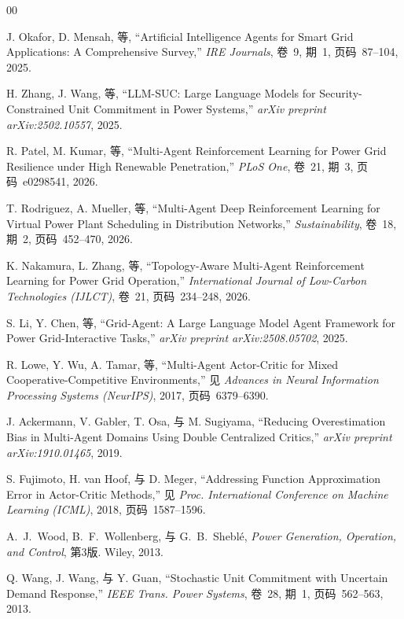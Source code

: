 \documentclass[conference]{IEEEtran}
\begin{document}
\begin{thebibliography}{00}

J. Okafor, D. Mensah, 等, ``Artificial Intelligence Agents for Smart Grid Applications: A Comprehensive Survey,''
\emph{IRE Journals}, 卷~9, 期~1, 页码~87--104, 2025.

H. Zhang, J. Wang, 等, ``LLM-SUC: Large Language Models for Security-Constrained Unit Commitment in Power Systems,''
\emph{arXiv preprint arXiv:2502.10557}, 2025.

R. Patel, M. Kumar, 等, ``Multi-Agent Reinforcement Learning for Power Grid Resilience under High Renewable Penetration,''
\emph{PLoS One}, 卷~21, 期~3, 页码~e0298541, 2026.

T. Rodriguez, A. Mueller, 等, ``Multi-Agent Deep Reinforcement Learning for Virtual Power Plant Scheduling in Distribution Networks,''
\emph{Sustainability}, 卷~18, 期~2, 页码~452--470, 2026.

K. Nakamura, L. Zhang, 等, ``Topology-Aware Multi-Agent Reinforcement Learning for Power Grid Operation,''
\emph{International Journal of Low-Carbon Technologies (IJLCT)}, 卷~21, 页码~234--248, 2026.

S. Li, Y. Chen, 等, ``Grid-Agent: A Large Language Model Agent Framework for Power Grid-Interactive Tasks,''
\emph{arXiv preprint arXiv:2508.05702}, 2025.

R. Lowe, Y. Wu, A. Tamar, 等, ``Multi-Agent Actor-Critic for Mixed Cooperative-Competitive Environments,''
见 \emph{Advances in Neural Information Processing Systems (NeurIPS)}, 2017, 页码~6379--6390.

J. Ackermann, V. Gabler, T. Osa, 与 M. Sugiyama, ``Reducing Overestimation Bias in Multi-Agent Domains Using Double Centralized Critics,''
\emph{arXiv preprint arXiv:1910.01465}, 2019.

S. Fujimoto, H. van Hoof, 与 D. Meger, ``Addressing Function Approximation Error in Actor-Critic Methods,''
见 \emph{Proc. International Conference on Machine Learning (ICML)}, 2018, 页码~1587--1596.

A.~J.~Wood, B.~F.~Wollenberg, 与 G.~B.~Sheblé, \emph{Power Generation, Operation, and Control}, 第3版. Wiley, 2013.

Q. Wang, J. Wang, 与 Y. Guan, ``Stochastic Unit Commitment with Uncertain Demand Response,''
\emph{IEEE Trans. Power Systems}, 卷~28, 期~1, 页码~562--563, 2013.


\end{thebibliography}
\end{document}
